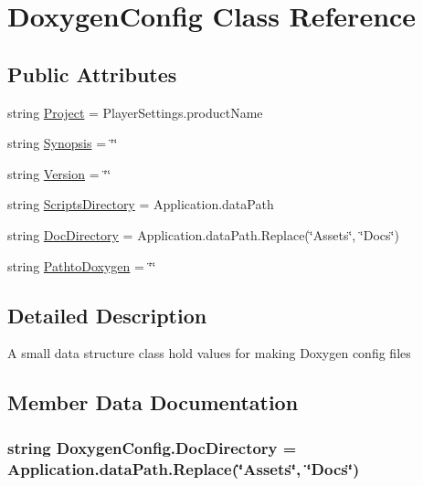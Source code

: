 \hypertarget{class_doxygen_config}{}\section{Doxygen\+Config Class Reference}
\label{class_doxygen_config}


 


\subsection*{Public Attributes}
\begin{DoxyCompactItemize}
\item 
string \hyperlink{class_doxygen_config_ae69318495ba1db9f3a4d88e01764f9b4}{Project} = Player\+Settings.\+product\+Name
\item 
string \hyperlink{class_doxygen_config_a2b1926144ba2768c36de32a8d3445567}{Synopsis} = \char`\"{}\char`\"{}
\item 
string \hyperlink{class_doxygen_config_af72cbcc553de9766a100f77f90c35626}{Version} = \char`\"{}\char`\"{}
\item 
string \hyperlink{class_doxygen_config_aea53b2e7fc0f47a7f658ce25e65c4a09}{Scripts\+Directory} = Application.\+data\+Path
\item 
string \hyperlink{class_doxygen_config_aea9ba41fe61487effafbeb77120749f0}{Doc\+Directory} = Application.\+data\+Path.\+Replace(\char`\"{}Assets\char`\"{}, \char`\"{}Docs\char`\"{})
\item 
string \hyperlink{class_doxygen_config_ad308ed1d0bdb202587fba232b754929f}{Pathto\+Doxygen} = \char`\"{}\char`\"{}
\end{DoxyCompactItemize}


\subsection{Detailed Description}


A small data structure class hold values for making Doxygen config files 

\subsection{Member Data Documentation}
\subsubsection[{\texorpdfstring{Doc\+Directory}{DocDirectory}}]{\setlength{\rightskip}{0pt plus 5cm}string Doxygen\+Config.\+Doc\+Directory = Application.\+data\+Path.\+Replace(\char`\"{}Assets\char`\"{}, \char`\"{}Docs\char`\"{})}\hypertarget{class_doxygen_config_aea9ba41fe61487effafbeb77120749f0}{}\label{class_doxygen_config_aea9ba41fe61487effafbeb77120749f0}

